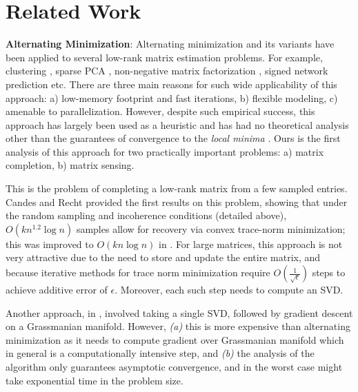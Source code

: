 \documentclass[11pt]{article}
\theoremstyle{plain}
\theoremstyle{definition}
\newcommand{\rmn}{\mathbb{R}^{m \times n}}
\begin{document}

\section{Related Work}\label{sec:related}
{\bf Alternating Minimization}: Alternating minimization and its variants have been applied to several low-rank matrix estimation problems. For example, clustering \cite{KimPark08b}, sparse PCA \cite{ZouHT06}, non-negative matrix factorization \cite{KimPar08}, signed network prediction \cite{HsiehCD12} etc. There are three main reasons for such wide applicability of this approach: a) low-memory footprint and fast iterations, b) flexible modeling, c) amenable to parallelization. However, despite such empirical success, this approach has largely been used as a heuristic and has had no theoretical analysis other than the guarantees of convergence to the {\em local minima} \cite{Zangwill69}. Ours is the first analysis of this approach for two practically important problems: a) matrix completion, b) matrix sensing. 

 This is the problem of completing a low-rank matrix from a few sampled entries. Candes and Recht  \cite{CandesR2007} provided the first results on this problem, showing that under the random sampling and incoherence conditions (detailed above), $O(kn^{1.2}\log n)$ samples allow for recovery via convex trace-norm minimization; this was improved to $O(kn\log n)$ in \cite{CandesT2009}. For large matrices, this approach is not very attractive due to the need to store and update the entire matrix, and because iterative methods for trace norm minimization require  $O(\frac{1}{\sqrt{\epsilon}})$ steps to achieve additive error of $\epsilon$. Moreover, each such step needs to compute an SVD. 

Another  approach, in \cite{KeshavanOM2009}, involved taking a single SVD, followed by gradient descent  on a Grassmanian manifold. However,  {\em (a)} this is more expensive than alternating minimization as it needs to compute gradient over Grassmanian manifold which in general is a computationally intensive step, and {\em (b)} the analysis of the algorithm only guarantees asymptotic convergence, and in the worst case might take exponential time in the problem size. 
\end{document}
